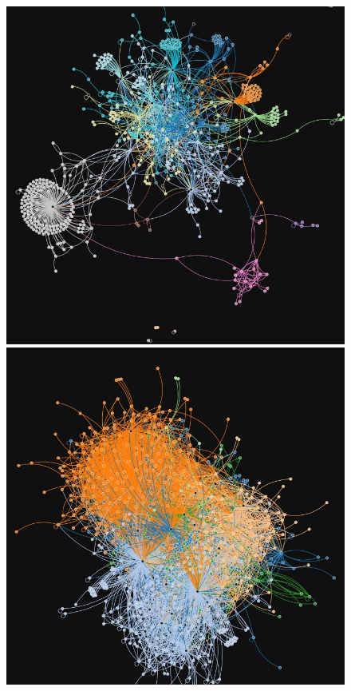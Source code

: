 \begin{figure}
\centering
	\includegraphics[width=.9\linewidth]{../Pictures/innovatoripa_01.jpg}\label{fig:InnoNet}
	\includegraphics[width=.9\linewidth]{../Pictures/edgeryders_02.jpg}\label{fig:EdgeNet}

\end{figure}
